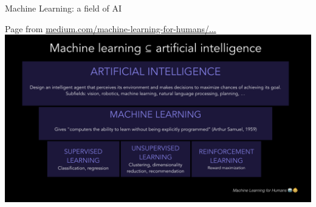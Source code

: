 \documentclass[10pt,serif,mathserif,compress,hyperref={colorlinks}]{beamer}
\begin{document}
\begin{frame}{Machine Learning: a field of AI}

  {\small Page from \href{https://medium.com/machine-learning-for-humans/why-machine-learning-matters-6164faf1df12}
  {medium.com/machine-learning-for-humans/...}}\\[2mm]
  
  \hspace*{-10mm}\includegraphics[width=1.2\textwidth]{images/AI-from_MachineLearningForHumans.png}
  \vspace*{-8mm}
  
\end{frame}
\end{document}
